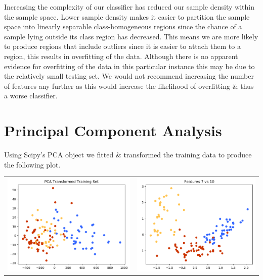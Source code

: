 \documentclass[11pt,a4paper]{article}
\begin{document}
\indent Increasing the complexity of our classifier has reduced our sample density within the sample space. Lower sample density makes it easier to partition the sample space into linearly separable class-homogeneous regions since the chance of a sample lying outside its class region has decreased. This means we are more likely to produce regions that include outliers since it is easier to attach them to a region, this results in overfitting of the data. Although there is no apparent evidence for overfitting of the data in this particular instance this may be due to the relatively small testing set. We would not recommend increasing the number of features any further as this would increase the likelihood of overfitting \& thus a worse classifier.

\section{Principal Component Analysis}
Using Scipy's PCA object we fitted \& transformed the training data to produce the following plot.
\begin{center}
\begin{tabular}{cc}
\includegraphics[scale=0.3]{img/pca.png}&
\includegraphics[scale=0.3]{img/7x10.png}
\end{tabular}
\end{center}
\end{document}
